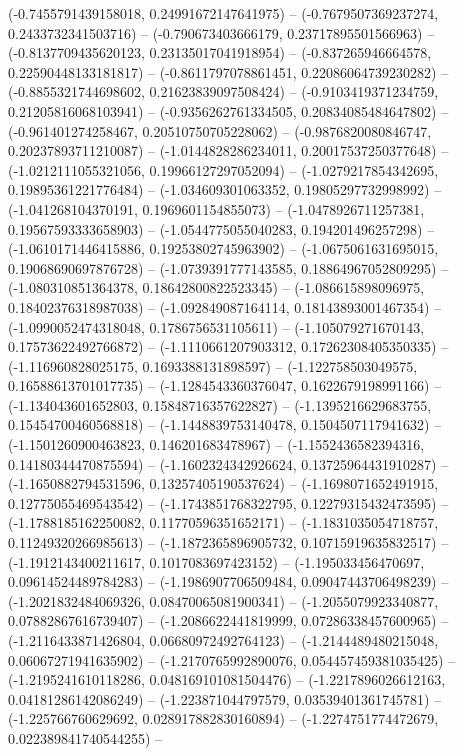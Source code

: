 \begin{scope}[blend group = overlay]
(-0.7455791439158018, 0.24991672147641975) -- 
(-0.7679507369237274, 0.2433732341503716) -- 
(-0.790673403666179, 0.23717895501566963) -- 
(-0.8137709435620123, 0.23135017041918954) -- 
(-0.837265946664578, 0.22590448133181817) -- 
(-0.8611797078861451, 0.22086064739230282) -- 
(-0.8855321744698602, 0.21623839097508424) -- 
(-0.9103419371234759, 0.21205816068103941) -- 
(-0.9356262761334505, 0.20834085484647802) -- 
(-0.961401274258467, 0.20510750705228062) -- 
(-0.9876820080846747, 0.20237893711210087) -- 
(-1.0144828286234011, 0.20017537250377648) -- 
(-1.0212111055321056, 0.19966127297052094) -- 
(-1.0279217854342695, 0.19895361221776484) -- 
(-1.034609301063352, 0.19805297732998992) -- 
(-1.041268104370191, 0.1969601154855073) -- 
(-1.0478926711257381, 0.19567593333658903) -- 
(-1.0544775055040283, 0.194201496257298) -- 
(-1.0610171446415886, 0.19253802745963902) -- 
(-1.0675061631695015, 0.19068690697876728) -- 
(-1.0739391777143585, 0.18864967052809295) -- 
(-1.080310851364378, 0.18642800822523345) -- 
(-1.086615898096975, 0.18402376318987038) -- 
(-1.092849087164114, 0.18143893001467354) -- 
(-1.0990052474318048, 0.1786756531105611) -- 
(-1.105079271670143, 0.17573622492766872) -- 
(-1.1110661207903312, 0.17262308405350335) -- 
(-1.116960828025175, 0.1693388131898597) -- 
(-1.122758503049575, 0.16588613701017735) -- 
(-1.1284543360376047, 0.1622679198991166) -- 
(-1.134043601652803, 0.15848716357622827) -- 
(-1.1395216629683755, 0.15454700460568818) -- 
(-1.1448839753140478, 0.1504507117941632) -- 
(-1.1501260900463823, 0.146201683478967) -- 
(-1.1552436582394316, 0.14180344470875594) -- 
(-1.1602324342926624, 0.13725964431910287) -- 
(-1.1650882794531596, 0.13257405190537624) -- 
(-1.1698071652491915, 0.12775055469543542) -- 
(-1.1743851768322795, 0.12279315432473595) -- 
(-1.1788185162250082, 0.11770596351652171) -- 
(-1.1831035054718757, 0.11249320266985613) -- 
(-1.1872365896905732, 0.10715919635832517) -- 
(-1.1912143400211617, 0.1017083697423152) -- 
(-1.195033456470697, 0.09614524489784283) -- 
(-1.1986907706509484, 0.09047443706498239) -- 
(-1.2021832484069326, 0.08470065081900341) -- 
(-1.2055079923340877, 0.07882867616739407) -- 
(-1.2086622441819999, 0.07286338457600965) -- 
(-1.2116433871426804, 0.06680972492764123) -- 
(-1.2144489480215048, 0.06067271941635902) -- 
(-1.2170765992890076, 0.054457459381035425) -- 
(-1.2195241610118286, 0.048169101081504476) -- 
(-1.2217896026612163, 0.04181286142086249) -- 
(-1.223871044797579, 0.03539401361745781) -- 
(-1.225766760629692, 0.028917882830160894) -- 
(-1.2274751774472679, 0.022389841740544255) -- 

\end{scope}
